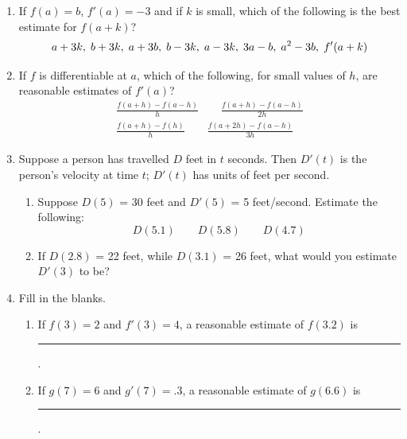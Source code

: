 \begin{enumerate}
  \begin{enumerate}
  \item Draw the graph of what you see in the microscope.

  \item Estimate $g(-4.2)$ and $g(-3.75)$.

  \item For what value of $t$ near $-4$ would you estimate that $g(t) =
6$?  For what value of $t$ would you estimate $g(t) = 8.5$?



\end{enumerate}
\item If $f(a) = b$, $f'(a) = -3$ and if $k$ is small, which of the
following is the best estimate for $f(a + k)$?
	\[
a + 3k\/, \; b + 3k\/, \; a + 3b\/, \; b - 3k\/, \; 
	a - 3k\/, \; 3a - b\/, \;  a^2 - 3b\/, \; f'(a + k)
\]


\item If $f$ is differentiable at $a$, which of the following, for
small values of $h$, are reasonable estimates of $f'(a)$?
\begin{gather*}
\frac{f(a+h)-f(a-h)}{h} \qquad  \frac{f(a+h)-f(a-h)}{2h}  \\ 
\frac{f(a+h)-f(h)}{h} \qquad  \frac{f(a+2h)-f(a-h)}{3h} 
\end{gather*}


\item Suppose a person has travelled $D$ feet in $t$ seconds.  Then
$D'(t)$ is the person's velocity at time $t$; $D'(t)$ has units of
feet per second.

  \begin{enumerate}
  \item Suppose $D(5)$ = 30 feet and $D'(5)$ = 5 feet/second.  Estimate
the following:
\[
D(5.1) \qquad  D(5.8) \qquad  D(4.7)
\]


  \item If $D(2.8)$ = 22 feet, while $D(3.1)$ = 26 feet, what would you
estimate $D'(3)$ to be?


\end{enumerate}
\item Fill in the blanks.

  \begin{enumerate}
  \item If $f(3) = 2$ and $f'(3) = 4$, a reasonable estimate of $f(3.2)$
is \rule[-3pt]{.3in}{.3pt}.

  \item If $g(7) = 6$ and $g'(7) = .3$, a reasonable estimate of $g(6.6)$
is \rule[-3pt]{.3in}{.3pt}.


\end{enumerate}
\end{enumerate}
